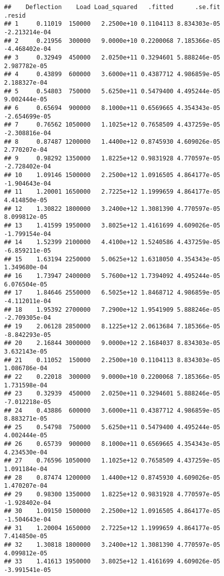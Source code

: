 \documentclass[]{book}
\theoremstyle{definition}
\theoremstyle{definition}
\theoremstyle{definition}
\theoremstyle{remark}
\begin{document}
\begin{verbatim}
##    Deflection    Load Load_squared   .fitted      .se.fit        .resid
## 1     0.11019  150000   2.2500e+10 0.1104113 8.834303e-05 -2.213214e-04
## 2     0.21956  300000   9.0000e+10 0.2200068 7.185366e-05 -4.468402e-04
## 3     0.32949  450000   2.0250e+11 0.3294601 5.888246e-05  2.987782e-05
## 4     0.43899  600000   3.6000e+11 0.4387712 4.986859e-05  2.188327e-04
## 5     0.54803  750000   5.6250e+11 0.5479400 4.495244e-05  9.002444e-05
## 6     0.65694  900000   8.1000e+11 0.6569665 4.354343e-05 -2.654699e-05
## 7     0.76562 1050000   1.1025e+12 0.7658509 4.437259e-05 -2.308816e-04
## 8     0.87487 1200000   1.4400e+12 0.8745930 4.609026e-05  2.770207e-04
## 9     0.98292 1350000   1.8225e+12 0.9831928 4.770597e-05 -2.728402e-04
## 10    1.09146 1500000   2.2500e+12 1.0916505 4.864177e-05 -1.904643e-04
## 11    1.20001 1650000   2.7225e+12 1.1999659 4.864177e-05  4.414850e-05
## 12    1.30822 1800000   3.2400e+12 1.3081390 4.770597e-05  8.099812e-05
## 13    1.41599 1950000   3.8025e+12 1.4161699 4.609026e-05 -1.799154e-04
## 14    1.52399 2100000   4.4100e+12 1.5240586 4.437259e-05 -6.859211e-05
## 15    1.63194 2250000   5.0625e+12 1.6318050 4.354343e-05  1.349680e-04
## 16    1.73947 2400000   5.7600e+12 1.7394092 4.495244e-05  6.076504e-05
## 17    1.84646 2550000   6.5025e+12 1.8468712 4.986859e-05 -4.112011e-04
## 18    1.95392 2700000   7.2900e+12 1.9541909 5.888246e-05 -2.709305e-04
## 19    2.06128 2850000   8.1225e+12 2.0613684 7.185366e-05 -8.842293e-05
## 20    2.16844 3000000   9.0000e+12 2.1684037 8.834303e-05  3.632143e-05
## 21    0.11052  150000   2.2500e+10 0.1104113 8.834303e-05  1.086786e-04
## 22    0.22018  300000   9.0000e+10 0.2200068 7.185366e-05  1.731598e-04
## 23    0.32939  450000   2.0250e+11 0.3294601 5.888246e-05 -7.012218e-05
## 24    0.43886  600000   3.6000e+11 0.4387712 4.986859e-05  8.883271e-05
## 25    0.54798  750000   5.6250e+11 0.5479400 4.495244e-05  4.002444e-05
## 26    0.65739  900000   8.1000e+11 0.6569665 4.354343e-05  4.234530e-04
## 27    0.76596 1050000   1.1025e+12 0.7658509 4.437259e-05  1.091184e-04
## 28    0.87474 1200000   1.4400e+12 0.8745930 4.609026e-05  1.470207e-04
## 29    0.98300 1350000   1.8225e+12 0.9831928 4.770597e-05 -1.928402e-04
## 30    1.09150 1500000   2.2500e+12 1.0916505 4.864177e-05 -1.504643e-04
## 31    1.20004 1650000   2.7225e+12 1.1999659 4.864177e-05  7.414850e-05
## 32    1.30818 1800000   3.2400e+12 1.3081390 4.770597e-05  4.099812e-05
## 33    1.41613 1950000   3.8025e+12 1.4161699 4.609026e-05 -3.991541e-05

\end{verbatim}
\end{document}
